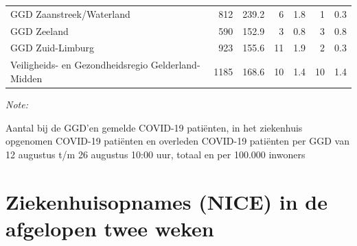 \documentclass[
  english,
  man,floatsintext]{apa6}
\begin{document}
\begin{table}
\begin{threeparttable}
\begin{tabular}{lrrrrrr}
GGD Zaanstreek/Waterland & 812 & 239.2 & 6 & 1.8 & 1 & 0.3\\
GGD Zeeland & 590 & 152.9 & 3 & 0.8 & 3 & 0.8\\
GGD Zuid-Limburg & 923 & 155.6 & 11 & 1.9 & 2 & 0.3\\
Veiligheids- en Gezondheidsregio Gelderland-Midden & 1185 & 168.6 & 10 & 1.4 & 10 & 1.4\\
\bottomrule
\end{tabular}
\begin{tablenotes}
\item \textit{Note: } 
\item Aantal bij de GGD’en gemelde COVID-19 patiënten, in het ziekenhuis opgenomen COVID-19 patiënten en overleden COVID-19 patiënten per GGD van 12 augustus t/m 26 augustus 10:00 uur, totaal en per 100.000 inwoners
\end{tablenotes}
\end{threeparttable}
\endgroup{}
\end{table}

\newpage

\hypertarget{ziekenhuisopnames-nice-in-de-afgelopen-twee-weken}{%
\section{Ziekenhuisopnames (NICE) in de afgelopen twee weken}\label{ziekenhuisopnames-nice-in-de-afgelopen-twee-weken}}
\end{document}
